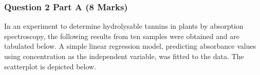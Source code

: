 \documentclass[a4paper,12pt]{article}
\begin{document}
\subsubsection*{Question 2 Part A (8 Marks)}
In an experiment to determine hydrolysable tannins in plants by absorption spectroscopy, the following results from ten samples were obtained and are tabulated below. A simple linear regression model, predicting absorbance values using concentration as the independent variable, was fitted to the data. The scatterplot is depicted below.
\end{document}
